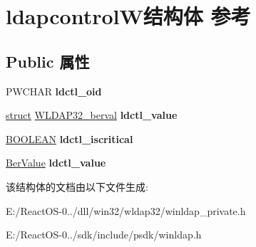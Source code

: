 \hypertarget{structldapcontrol_w}{}\section{ldapcontrol\+W结构体 参考}
\label{structldapcontrol_w}
\subsection*{Public 属性}
\begin{DoxyCompactItemize}
\item 
\mbox{\label{structldapcontrol_w_aa938094e437b2f464770e5c1fc87192c}} 
P\+W\+C\+H\+AR {\bfseries ldctl\+\_\+oid}
\item 
\mbox{\label{structldapcontrol_w_ad80fc3204d1c2e48c34609b965c85fde}} 
\hyperlink{interfacestruct}{struct} \hyperlink{struct_w_l_d_a_p32__berval}{W\+L\+D\+A\+P32\+\_\+berval} {\bfseries ldctl\+\_\+value}
\item 
\mbox{\label{structldapcontrol_w_a6bcb1547b155c98317525b28215bf5de}} 
\hyperlink{_processor_bind_8h_a112e3146cb38b6ee95e64d85842e380a}{B\+O\+O\+L\+E\+AN} {\bfseries ldctl\+\_\+iscritical}
\item 
\mbox{\label{structldapcontrol_w_ab23b4f3e47b04763bc2cc98463cc52a1}} 
\hyperlink{structberval}{Ber\+Value} {\bfseries ldctl\+\_\+value}
\end{DoxyCompactItemize}


该结构体的文档由以下文件生成\+:\begin{DoxyCompactItemize}
\item 
E\+:/\+React\+O\+S-\/0../dll/win32/wldap32/winldap\+\_\+private.\+h\item 
E\+:/\+React\+O\+S-\/0../sdk/include/psdk/winldap.\+h\end{DoxyCompactItemize}
